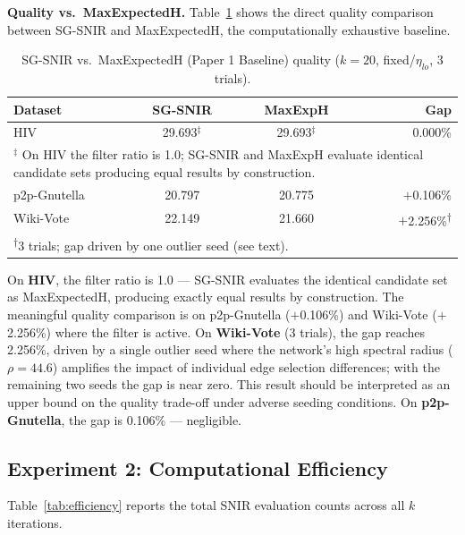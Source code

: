 \documentclass[conference]{IEEEtran}
\begin{document}
\textbf{Quality vs.\ MaxExpectedH.}
Table~\ref{tab:quality_gap} shows the direct quality comparison between SG-SNIR and MaxExpectedH, the computationally exhaustive baseline.

\begin{table}[htbp]
\caption{SG-SNIR vs.\ MaxExpectedH (Paper 1 Baseline) quality ($k=20$, fixed/$\eta_{lo}$, 3 trials).}
\label{tab:quality_gap}
\centering
\begin{tabular}{lccr}
\hline
\textbf{Dataset} & \textbf{SG-SNIR} & \textbf{MaxExpH} & \textbf{Gap} \\
\hline
HIV & 29.693$^{\ddagger}$ & 29.693$^{\ddagger}$ & 0.000\% \\
\multicolumn{4}{p{0.95\columnwidth}}{\small $^{\ddagger}$ On HIV the filter ratio is 1.0; SG-SNIR and MaxExpH evaluate identical candidate sets producing equal results by construction.} \\
p2p-Gnutella & 20.797 & 20.775 & $+$0.106\% \\
Wiki-Vote & 22.149 & 21.660 & $+$2.256\%\textsuperscript{$\dagger$} \\
\hline
\multicolumn{4}{p{0.95\columnwidth}}{\small \textsuperscript{$\dagger$}3 trials; gap driven by one outlier seed (see text).} \\
\end{tabular}
\end{table}

On \textbf{HIV}, the filter ratio is 1.0 --- SG-SNIR evaluates the identical candidate set as MaxExpectedH, producing exactly equal results by construction. The meaningful quality comparison is on p2p-Gnutella ($+$0.106\%) and Wiki-Vote ($+$2.256\%) where the filter is active. On \textbf{Wiki-Vote} (3 trials), the gap reaches 2.256\%, driven by a single outlier seed where the network's high spectral radius ($\rho=44.6$) amplifies the impact of individual edge selection differences; with the remaining two seeds the gap is near zero. This result should be interpreted as an upper bound on the quality trade-off under adverse seeding conditions. On \textbf{p2p-Gnutella}, the gap is 0.106\% --- negligible.

\subsection{Experiment 2: Computational Efficiency}

Table~\ref{tab:efficiency} reports the total SNIR evaluation counts across all $k$ iterations.
\end{document}
